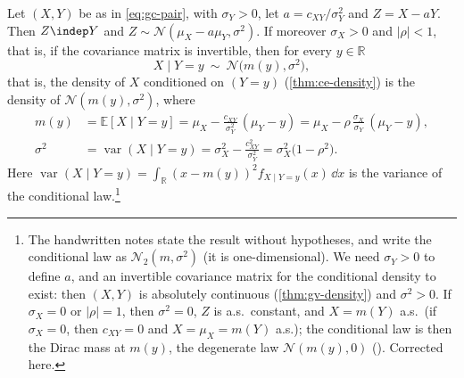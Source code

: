 \begin{theorem}\label{thm:gc-bivariate}
Let $(X,Y)$ be as in \eqref{eq:gc-pair}, with $\sigma_Y>0$, let $a=c_{XY}/\sigma_Y^2$ and
$Z=X-aY$. Then $Z\indep Y$ and $Z\sim\mathcal N(\mu_X-a\mu_Y,\sigma^2)$. If moreover $\sigma_X>0$
and $|\rho|<1$, that is, if the covariance matrix is invertible, then for every $y\in\mathbb R$
\[
  X\mid Y=y\ \sim\ \mathcal N\big(m(y),\sigma^2\big),
\]
that is, the density of $X$ conditioned on $(Y=y)$ (\cref{thm:ce-density}) is the density of
$\mathcal N(m(y),\sigma^2)$, where
\begin{align}
  m(y)&=\mathbb E[X\mid Y=y]=\mu_X-\frac{c_{XY}}{\sigma_Y^2}\,(\mu_Y-y)
       =\mu_X-\rho\,\frac{\sigma_X}{\sigma_Y}\,(\mu_Y-y),\label{eq:gc-mean}\\
  \sigma^2&=\operatorname{var}(X\mid Y=y)=\sigma_X^2-\frac{c_{XY}^2}{\sigma_Y^2}=\sigma_X^2\big(1-\rho^2\big).\label{eq:gc-variance}
\end{align}
Here $\operatorname{var}(X\mid Y=y)=\int_{\mathbb R}(x-m(y))^2f_{X\mid Y=y}(x)\,\dd x$ is the variance of
the conditional law.\footnote{The handwritten notes state the result without hypotheses, and write
the conditional law as $\mathcal N_2(m,\sigma^2)$ (it is one-dimensional). We need $\sigma_Y>0$ to
define $a$, and an invertible covariance matrix for the conditional density to exist: then $(X,Y)$
is absolutely continuous (\cref{thm:gv-density}) and $\sigma^2>0$. If $\sigma_X=0$ or $|\rho|=1$, then
$\sigma^2=0$, $Z$ is a.s.\ constant, and $X=m(Y)$ a.s.\ (if $\sigma_X=0$, then $c_{XY}=0$ and
$X=\mu_X=m(Y)$ a.s.); the conditional law is then the Dirac mass at $m(y)$, the degenerate law
$\mathcal N(m(y),0)$ (). Corrected here.}
\end{theorem}

